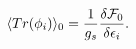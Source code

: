 \begin{equation}
\langle Tr(\phi _{i})\rangle _{0}=\frac{1}{g_{s}}\frac{\delta {\cal F}_{0}}{%
\delta \epsilon _{i}}.
\end{equation}

